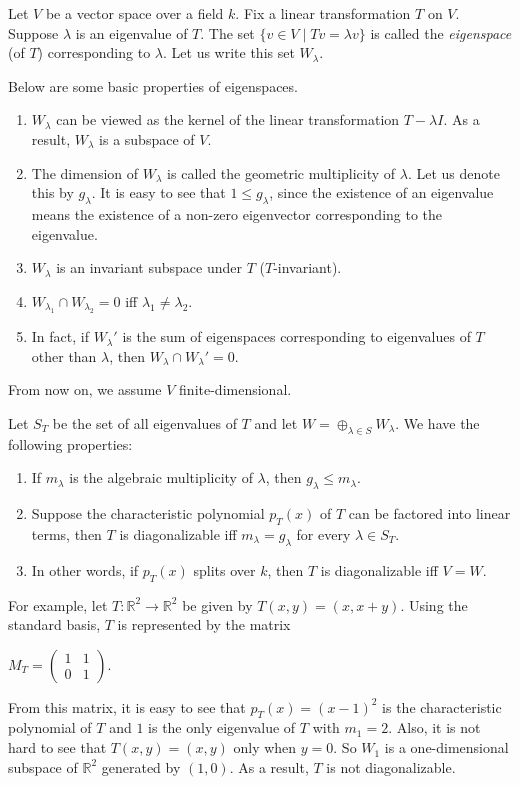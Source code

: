 \documentclass[12pt]{article}
\begin{document}
Let $V$ be a vector space over a field $k$.  Fix a linear transformation $T$ on $V$.  Suppose $\lambda$ is an eigenvalue of $T$.  The set $\lbrace v\in V\mid Tv=\lambda v\rbrace$ is called the \emph{eigenspace} (of $T$) corresponding to $\lambda$.  Let us write this set $W_{\lambda}$.

Below are some basic properties of eigenspaces.
\begin{enumerate}
\item $W_{\lambda}$ can be viewed as the kernel of the linear transformation $T-\lambda I$.  As a result, $W_{\lambda}$ is a subspace of $V$.  
\item The dimension of $W_{\lambda}$ is called the geometric multiplicity of $\lambda$.  Let us denote this by $g_{\lambda}$.  It is easy to see that $1\le g_{\lambda}$, since the existence of an eigenvalue means the existence of a non-zero eigenvector corresponding to the eigenvalue.  
\item $W_{\lambda}$ is an invariant subspace under $T$ ($T$-invariant).  
\item $W_{\lambda_1}\cap W_{\lambda_2}=0$ iff $\lambda_1\ne \lambda_2$.
\item In fact, if $W_{\lambda}'$ is the sum of eigenspaces corresponding to eigenvalues of $T$ other than $\lambda$, then $W_{\lambda}\cap W_{\lambda}'=0$.
\end{enumerate}

From now on, we assume $V$ finite-dimensional.  

Let $S_T$ be the set of all eigenvalues of $T$ and let $W=\oplus_{\lambda \in S} W_{\lambda}$.  We have the following properties:

\begin{enumerate}
\item If $m_{\lambda}$ is the algebraic multiplicity of $\lambda$, then $g_{\lambda}\le m_{\lambda}$. 
\item Suppose the characteristic polynomial $p_T(x)$ of $T$ can be factored into linear terms, then $T$ is diagonalizable iff $m_{\lambda}=g_{\lambda}$ for every $\lambda\in S_T$.
\item In other words, if $p_T(x)$ splits over $k$, then $T$ is diagonalizable iff $V=W$.
\end{enumerate}

For example, let $T:\mathbb{R}^2\to \mathbb{R}^2$ be given by $T(x,y)=(x,x+y)$.  Using the standard basis, $T$ is represented by the matrix 
\begin{center}$M_T=
\begin{pmatrix}
1 & 1 \\
0 & 1
\end{pmatrix}.$
\end{center}
From this matrix, it is easy to see that $p_T(x)=(x-1)^2$ is the characteristic polynomial of $T$ and $1$ is the only eigenvalue of $T$ with $m_1=2$.  Also, it is not hard to see that $T(x,y)=(x,y)$ only when $y=0$.  So $W_1$ is a one-dimensional subspace of $\mathbb{R}^2$ generated by $(1,0)$.  As a result, $T$ is not diagonalizable.
\end{document}
